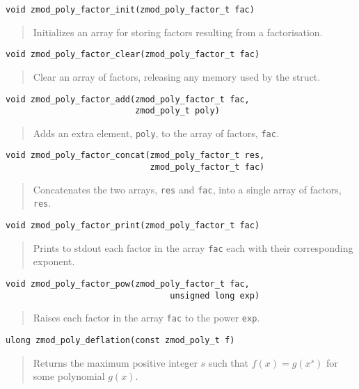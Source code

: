 \documentclass[a4paper,10pt]{article}
\newcommand{\code}{\lstinline}
\begin{document}
\begin{lstlisting}
void zmod_poly_factor_init(zmod_poly_factor_t fac)
\end{lstlisting}
\begin{quote}
Initializes an array for storing factors resulting from a factorisation.  \end{quote}

\begin{lstlisting}
void zmod_poly_factor_clear(zmod_poly_factor_t fac)
\end{lstlisting}
\begin{quote}
Clear an array of factors, releasing any memory used by the struct.
\end{quote}

\begin{lstlisting}
void zmod_poly_factor_add(zmod_poly_factor_t fac,
                          zmod_poly_t poly)
\end{lstlisting}
\begin{quote}
Adds an extra element, \code{poly}, to the array of factors, \code{fac}.  
\end{quote}

\begin{lstlisting}
void zmod_poly_factor_concat(zmod_poly_factor_t res,
                             zmod_poly_factor_t fac)
\end{lstlisting}
\begin{quote}
Concatenates the two arrays, \code{res} and \code{fac}, into a single array of factors, \code{res}.  
\end{quote}

\begin{lstlisting}
void zmod_poly_factor_print(zmod_poly_factor_t fac)
\end{lstlisting}
\begin{quote}
Prints to stdout each factor in the array \code{fac} each with their corresponding exponent.
\end{quote}

\begin{lstlisting}
void zmod_poly_factor_pow(zmod_poly_factor_t fac, 
                                 unsigned long exp)
\end{lstlisting}
\begin{quote}
Raises each factor in the array \code{fac} to the power \code{exp}.
\end{quote}

\begin{lstlisting}
ulong zmod_poly_deflation(const zmod_poly_t f)
\end{lstlisting}
\begin{quote}
Returns the maximum positive integer $s$ such that $f(x) = g(x^s)$ for some polynomial $g(x)$.
\end{quote}
\end{document}
